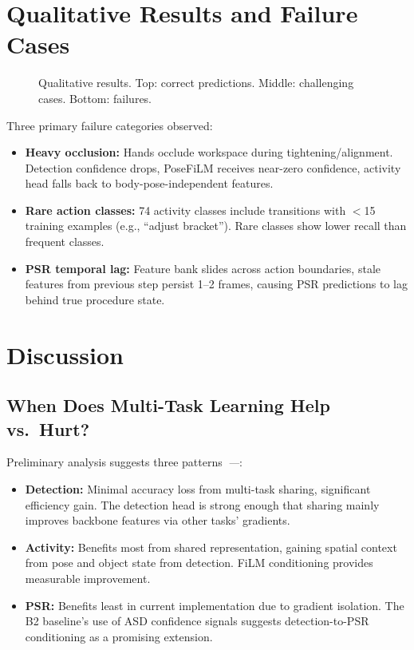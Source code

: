 \documentclass[10pt,journal,compsoc]{IEEEtran}
\newcommand{\todo}{\textit{---}}
\newcommand{\popwres}{\todo}
\begin{document}
\FloatBarrier

\section{Qualitative Results and Failure Cases}
\label{sec:qualitative}

\begin{figure}[htbp]
\centering
{}
\caption{Qualitative results. Top: correct predictions. Middle: challenging cases. Bottom: failures.}
\label{fig:qualitative}
\end{figure}

Three primary failure categories observed:
\begin{itemize}[nosep]
\item \textbf{Heavy occlusion:} Hands occlude workspace during tightening/alignment. Detection confidence drops, PoseFiLM receives near-zero confidence, activity head falls back to body-pose-independent features.
\item \textbf{Rare action classes:} 74 activity classes include transitions with $<$15 training examples (e.g., ``adjust bracket''). Rare classes show lower recall than frequent classes.
\item \textbf{PSR temporal lag:} Feature bank slides across action boundaries, stale features from previous step persist 1--2 frames, causing PSR predictions to lag behind true procedure state.
\end{itemize}

\FloatBarrier

\section{Discussion}
\label{sec:discussion}

\subsection{When Does Multi-Task Learning Help vs.\ Hurt?}

Preliminary analysis suggests three patterns~\popwres:
\begin{itemize}[nosep]
\item \textbf{Detection:} Minimal accuracy loss from multi-task sharing, significant efficiency gain. The detection head is strong enough that sharing mainly improves backbone features via other tasks' gradients.
\item \textbf{Activity:} Benefits most from shared representation, gaining spatial context from pose and object state from detection. FiLM conditioning provides measurable improvement.
\item \textbf{PSR:} Benefits least in current implementation due to gradient isolation. The B2 baseline's use of ASD confidence signals suggests detection-to-PSR conditioning as a promising extension.
\end{itemize}
\end{document}
